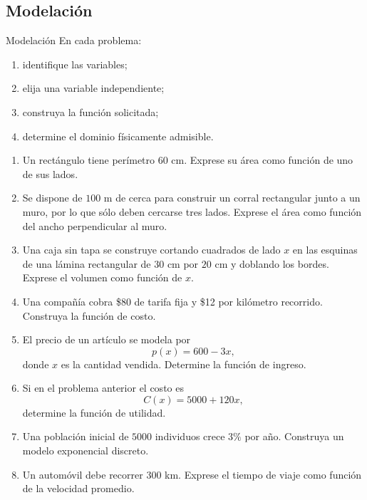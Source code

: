 \documentclass[aspectratio=169,10pt]{beamer}
\begin{document}
\subsection*{Modelación}
\begin{frame}{Modelación}
En cada problema:
\begin{enumerate}
    \item identifique las variables;
    \item elija una variable independiente;
    \item construya la función solicitada;
    \item determine el dominio físicamente admisible.
\end{enumerate}

\begin{enumerate}
    \item Un rectángulo tiene perímetro $60$ cm. Exprese su área como función
    de uno de sus lados.

    \item Se dispone de $100$ m de cerca para construir un corral rectangular
    junto a un muro, por lo que sólo deben cercarse tres lados. Exprese el área
    como función del ancho perpendicular al muro.

    \item Una caja sin tapa se construye cortando cuadrados de lado $x$ en las
    esquinas de una lámina rectangular de $30$ cm por $20$ cm y doblando los
    bordes. Exprese el volumen como función de $x$.

    \item Una compañía cobra \$80 de tarifa fija y \$12 por kilómetro recorrido.
    Construya la función de costo.

    \item El precio de un artículo se modela por
    \[
    p(x)=600-3x,
    \]
    donde $x$ es la cantidad vendida. Determine la función de ingreso.

    \item Si en el problema anterior el costo es
    \[
    C(x)=5000+120x,
    \]
    determine la función de utilidad.

    \item Una población inicial de $5000$ individuos crece $3\%$ por año.
    Construya un modelo exponencial discreto.

    \item Un automóvil debe recorrer $300$ km. Exprese el tiempo de viaje como
    función de la velocidad promedio.
\end{enumerate}
\end{frame}
\end{document}
